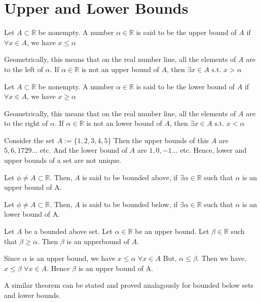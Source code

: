\documentclass{scrartcl}
\newcommand{\rn}{\mathbb{R}}
\begin{document}
    \section{Upper and Lower Bounds}
    \begin{definition}
        Let $A \subset \rn$ be nonempty. A number $\alpha \in \rn$ is said to be the upper bound of $A$ if $\forall x \in A$, we have $x \leq \alpha$
    \end{definition}
    Geometrically, this means that on the real number line, all the elements of $A$ are to the left of $\alpha$. If $\alpha \in \rn$ is not an upper bound of $A$, then $\exists x \in A \text{ s.t. } x > \alpha$
    \begin{definition}
        Let $A \subset \rn$ be nonempty. A number $\alpha \in \rn$ is said to be the lower bound of $A$ if $\forall x \in A$, we have $x \geq \alpha$
    \end{definition}
    Geometrically, this means that on the real number line, all the elements of $A$ are to the right of $\alpha$. If $\alpha \in \rn$ is not an lower bound of $A$, then $\exists x \in A \text{ s.t. } x < \alpha$
    \begin{example}
        Consider the set $A := \{1, 2, 3, 4, 5\}$ Then the upper bounds of this $A$ are $5, 6, 1729 \dots$ etc.
        And the lower bound of $A$ are $1, 0, -1 \dots$ etc. Hence, lower and upper bounds of a set are not unique.
    \end{example}
    \begin{definition}
        Let $\phi \neq A \subset \rn$. Then, $A$ is said to be bounded above, if $\exists \alpha \in \rn$ such that $\alpha$ is an upper bound of A.
    \end{definition}
    \begin{definition}
        Let $\phi \neq A \subset \rn$. Then, $A$ is said to be bounded below, if $\exists \alpha \in \rn$ such that $\alpha$ is an lower bound of A.
    \end{definition}
    \begin{theorem}
        Let $A$ be a bounded above set. Let $\alpha \in \rn$ be an upper bound. Let $\beta \in \rn$ such that 
        $\beta \geq \alpha$. Then $\beta$ is an upperbound of $A$.
        \begin{proof*}
            Since $\alpha$ is an upper bound, we have $x \leq \alpha \,\, \forall x \in A$
            But, $\alpha \leq \beta$. Then we have, $x \leq \beta \,\, \forall x \in A$.
            Hence $\beta$ is an upper bound of A.
        \end{proof*}
    A similar theorem can be stated and proved analagously for bounded below sets and lower bounds.
    \end{theorem}
\end{document}
